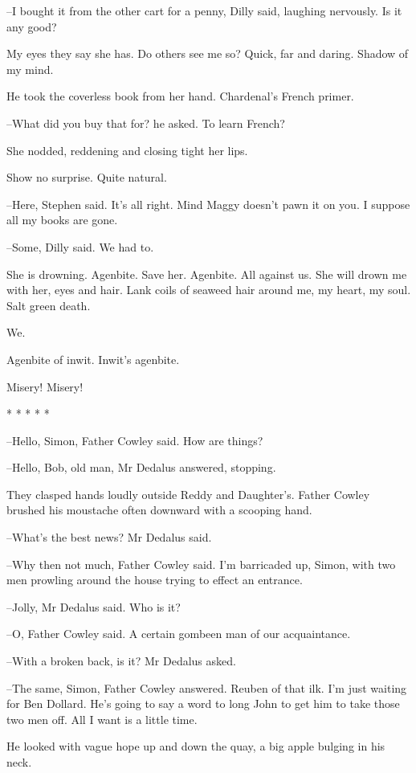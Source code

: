 --I bought it from the other cart for a penny, Dilly said, laughing
nervously. Is it any good?

My eyes they say she has. Do others see me so? Quick, far and daring.
Shadow of my mind.

He took the coverless book from her hand. Chardenal's French primer.

--What did you buy that for? he asked. To learn French?

She nodded,
reddening and closing tight her lips.

Show no surprise. Quite natural.

--Here, Stephen said. It's all right. Mind Maggy doesn't pawn it on you.
I suppose all my books are gone.

--Some, Dilly said. We had to.

She is drowning. Agenbite. Save her. Agenbite. All against us. She will
drown me with her, eyes and hair. Lank coils of seaweed hair around me,
my heart, my soul. Salt green death.

We.

Agenbite of inwit. Inwit's agenbite.

Misery!
Misery!


    * * * * *


--Hello, Simon, Father Cowley said. How are things?

--Hello, Bob, old man, Mr Dedalus answered, stopping.

They clasped hands loudly outside Reddy and Daughter's. Father Cowley
brushed his moustache often downward with a scooping hand.

--What's the best news? Mr Dedalus said.

--Why then not much, Father Cowley said. I'm barricaded up, Simon, with
two men prowling around the house trying to effect an entrance.

--Jolly, Mr Dedalus said. Who is it?

--O, Father Cowley said.
A certain gombeen man of our acquaintance.

--With a broken back, is it? Mr Dedalus asked.

--The same, Simon, Father Cowley answered. Reuben of that ilk. I'm just
waiting for Ben Dollard. He's going to say a word to long John to get him
to take those two men off. All I want is a little time.

He looked with vague hope up and down the quay, a big apple bulging in
his neck.

